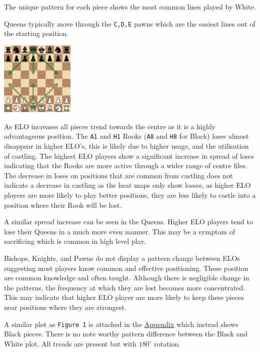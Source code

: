 \documentclass[11pt]{article}
\begin{document}
The unique pattern for each piece shows the most common lines played by White.

Queens typically move through the \texttt{C,D,E} pawns which are the easiest lines out of the starting position.
\begin{center}
\includegraphics[width=100pt]{Images/Queen lines.png}
\end{center}

As ELO increases all pieces trend towards the centre as it is a highly advantageous position. The \texttt{A1} and \texttt{H1} Rooks (\texttt{A8} and \texttt{H8} for Black) loses almost disappear in higher ELO's, this is likely due to higher usage, and the utilisation of castling. The highest ELO players show a significant increase in spread of loses indicating that the Rooks are more active through a wider range of centre files.
The decrease in loses on positions that are common from castling does not indicate a decrease in castling as the heat maps only show losses, as higher ELO players are more likely to play better positions, they are less likely to castle into a position where their Rook will be lost.

A similar spread increase can be seen in the Queens. Higher ELO players tend to lose their Queens in a much more even manner. This may be a symptom of sacrificing which is common in high level play.

Bishops, Knights, and Pawns do not display a pattern change between ELOs suggesting most players know common and effective positioning. These position are common knowledge and often taught. Although there is negligible change in the patterns, the frequency at which they are lost becomes more concentrated. This may indicate that higher ELO player are more likely to keep these pieces near positions where they are strongest.


A similar plot as \texttt{Figure 1} is attached in the \hyperref[sec:orgdcc6828]{Appendix} which instead shows Black pieces. There is no note worthy pattern difference between the Black and White plot. All treads are present but with \(180^{\circ}\) rotation.
\end{document}
